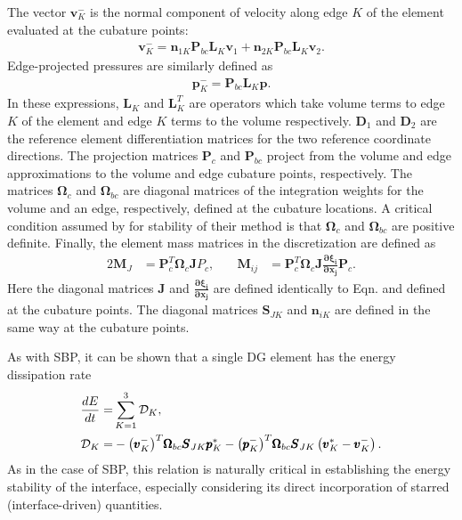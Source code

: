 The vector $\pmb{v}_{K}^{-}$ is the normal component of velocity along
edge $K$ of the element evaluated at the cubature points:
\begin{align}
  \pmb{v}^{-}_{K} = \pmb{n}_{1K} \pmb{P}_{bc} \pmb{L}_{K} \pmb{v}_{1}
  + \pmb{n}_{2K} \pmb{P}_{bc} \pmb{L}_{K} \pmb{v}_{2}.
\end{align}
Edge-projected pressures are similarly defined as
\begin{align}
  \pmb{p}_{K}^{-} = \pmb{P}_{bc}\pmb{L}_{K} \pmb{p}.
\end{align}
In these expressions, $\pmb{L}_{K}$ and $\pmb{L}_{K}^{T}$ are operators
which take volume terms to edge $K$ of the element and edge $K$ terms to
the volume respectively. $\pmb{D}_{1}$ and $\pmb{D}_{2}$ are the reference
element differentiation matrices for the two reference coordinate directions.
The projection matrices $\pmb{P}_{c}$ and $\pmb{P}_{bc}$ project from the volume and edge
approximations to the volume and edge cubature points, respectively. The matrices
$\pmb{\Omega}_{c}$ and $\pmb{\Omega}_{bc}$ are diagonal matrices of the integration weights for
the volume and an edge, respectively, defined at the cubature locations. A critical
condition assumed by \cite{kozdon2016stable} for stability of their method is that
$\pmb{\Omega}_{c}$ and $\pmb{\Omega}_{bc}$ are positive definite. Finally, the
element mass matrices in the discretization are defined as
\begin{alignat}{2}
  \pmb{M}_{J}  &= \pmb{P}_{c}^{T} \pmb{\Omega}_{c} \pmb{J} P_{c},\quad&
  \pmb{M}_{ij} &= \pmb{P}_{c}^{T} \pmb{\Omega}_{c} \pmb{J}
		  \frac{\pmb{\partial \xi_{i}}}{\pmb{\partial x_{j}}} \pmb{P}_{c}.
\end{alignat}
Here the diagonal matrices $\pmb{J}$ and $\pmb{\frac{\partial \xi_{i}}{\partial x_{j}}}$
are defined identically to Eqn.  and defined at the cubature points.
The diagonal matrices $\pmb{S}_{JK}$ and $\pmb{n}_{iK}$ are defined in the same way at the cubature
points.

As with SBP, it can be shown that a single DG element has
the energy dissipation rate
\begin{align}
  \frac{dE}{dt} = & \sum_{K=1}^{3} \mathcal{D}_{K},\\
  \mathcal{D}_{K} = &
  - {\left(\pmb{v}_{K}^{-}\right)}^{T}\pmb{\Omega}_{bc}\pmb{S}_{JK}\pmb{p}_{K}^{*}
  - {\left(\pmb{p}_{K}^{-}\right)}^{T}\pmb{\Omega}_{bc}\pmb{S}_{JK}
  \left(\pmb{v}^{*}_{K} - \pmb{v}^{-}_{K}\right). \label{eq:dg_diss}
\end{align}
As in the case of SBP, this relation is naturally critical in establishing the
energy stability of the interface, especially considering its direct incorporation
of starred (interface-driven) quantities.

